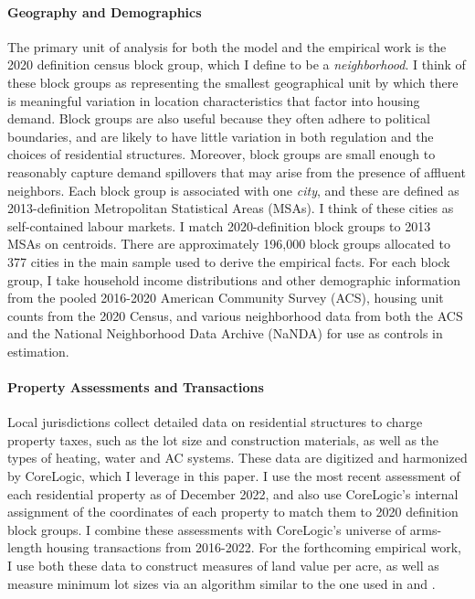 \documentclass[11pt]{article}
\begin{document}
	 \paragraph*{Geography and Demographics} The primary unit of analysis for both the model and the empirical work is the 2020 definition census block group, which I define to be a \textit{neighborhood}. I think of these block groups as representing the smallest geographical unit by which there is meaningful variation in location characteristics that factor into housing demand. Block groups are also useful because they often adhere to political boundaries, and are likely to have little variation in both regulation and the choices of residential structures. Moreover, block groups are small enough to reasonably capture demand spillovers that may arise from the presence of affluent neighbors. Each block group is associated with one \textit{city}, and these are defined as 2013-definition Metropolitan Statistical Areas (MSAs). I think of these cities as self-contained labour markets. I match 2020-definition block groups to 2013 MSAs on centroids. There are approximately 196,000 block groups allocated to 377 cities in the main sample used to derive the empirical facts. For each block group, I take household income distributions and other demographic information from the pooled 2016-2020 American Community Survey (ACS),  housing unit counts from the 2020 Census, and various neighborhood data from both the ACS and the National Neighborhood Data Archive (NaNDA) for use as controls in estimation.    
	 
	 \paragraph*{Property Assessments and Transactions} Local jurisdictions collect detailed data on residential structures to charge property taxes, such as the lot size and construction materials, as well as  the types of heating, water and AC systems. These data are digitized and harmonized by CoreLogic, which I leverage in this paper. I use the most recent assessment of each residential property as of December 2022, and also use CoreLogic's internal assignment of the coordinates of each property to match them to 2020 definition block groups. I combine these assessments with CoreLogic's universe of arms-length housing transactions from 2016-2022. For the forthcoming empirical work, I use both these data to construct measures of land value per acre, as well as measure minimum lot sizes via an algorithm similar to the one used in \cite{Song} and \cite{Cui}.
	  
\end{document}
